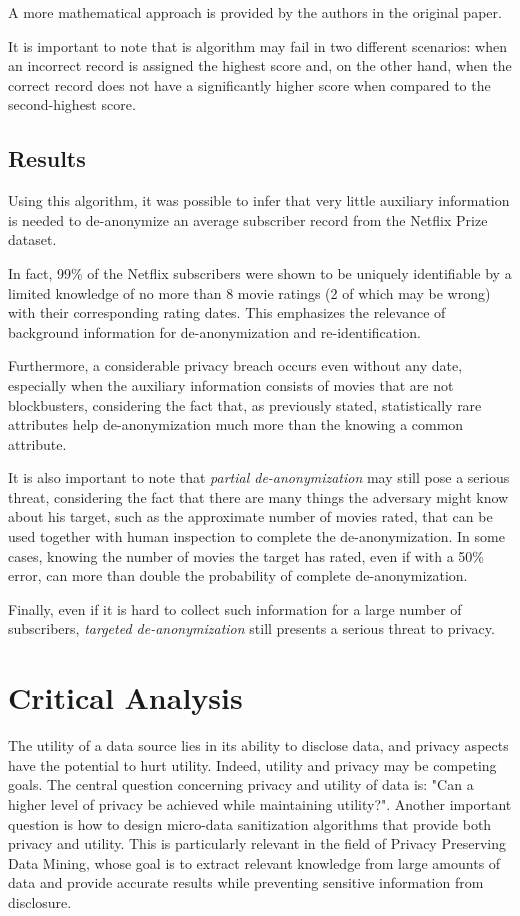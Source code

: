 \documentclass[conference]{IEEEtran}
\begin{document}
A more mathematical approach is provided by the authors in the original paper.

It is important to note that is algorithm may fail in two different scenarios: when an incorrect 
record is assigned the highest score and, on the other hand, when the correct record does not have 
a significantly higher score when compared to the second-highest score.

\subsection{Results}

Using this algorithm, it was possible to infer that very little auxiliary information is needed to 
de-anonymize an average subscriber record from the Netflix Prize dataset.

In fact, 99\% of the Netflix subscribers were shown to be uniquely identifiable by a limited 
knowledge of no more than 8 movie ratings (2 of which may be wrong) with their corresponding rating 
dates. This emphasizes the relevance of background information for de-anonymization and 
re-identification. 

Furthermore, a considerable privacy breach occurs even without any date, especially when the 
auxiliary information consists of movies that are not blockbusters, considering the fact that, as 
previously stated, statistically rare attributes help de-anonymization much more than the knowing a 
common attribute.

It is also important to note that \textit{partial de-anonymization} may still pose a serious 
threat, considering the fact that there are many things the adversary might know about his target, 
such as the approximate number of movies rated, that can be used together with human inspection to 
complete the de-anonymization. In some cases, knowing the number of movies the target has rated, 
even if with a 50\% error, can more than double the probability of complete de-anonymization.

Finally, even if it is hard to collect such information for a large number of subscribers, 
\textit{targeted de-anonymization} still presents a serious threat to privacy.

\section{Critical Analysis}

The utility of a data source lies in its ability to disclose data, and privacy aspects have the 
potential to hurt utility. Indeed, utility and privacy may be competing goals. The central question 
concerning privacy and utility of data is: "Can a higher level of privacy be achieved while 
maintaining utility?". Another important question is how to design micro-data sanitization 
algorithms that provide both privacy and utility. This is particularly relevant in the field of 
Privacy Preserving Data Mining, whose goal is to extract relevant knowledge from large amounts of 
data and provide accurate results while preventing sensitive information from disclosure.
\end{document}
